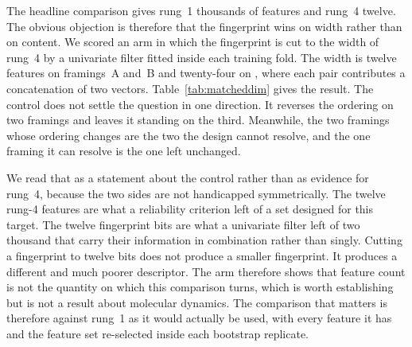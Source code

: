 The headline comparison gives rung~1 thousands of features and rung~4 twelve. The
obvious objection is therefore that the fingerprint wins on width rather than on
content. We scored an arm in which the fingerprint is cut to the width of rung~4 by a
univariate filter fitted inside each training fold. The width is twelve features on
framings~A and~B and twenty-four on \framingC{}, where each pair contributes a
concatenation of two vectors. Table~\ref{tab:matcheddim} gives the result. The control
does not settle the question in one direction. It reverses the ordering on two framings
and leaves it standing on the third. Meanwhile, the two framings whose ordering changes
are the two the design cannot resolve, and the one framing it can resolve is the one
left unchanged.

\begin{table}[tb]
  \centering
  \caption{\textbf{The matched-dimensionality control.} Rung~1 at its full width and
    cut to the width of rung~4 by a univariate filter fitted inside each training fold,
    against the best rung~4 reaches on the same framing. The last column marks the one
    framing on which this design can resolve a difference of the size it measures.}
  \label{tab:matcheddim}
  
\end{table}

We read that as a statement about the control rather than as evidence for rung~4,
because the two sides are not handicapped symmetrically. The twelve rung-4 features are
what a reliability criterion left of a set designed for this target. The twelve
fingerprint bits are what a univariate filter left of two thousand that carry their
information in combination rather than singly. Cutting a fingerprint to twelve bits
does not produce a smaller fingerprint. It produces a different and much poorer
descriptor. The arm therefore shows that feature count is not the quantity on which
this comparison turns, which is worth establishing but is not a result about molecular
dynamics. The comparison that matters is therefore against rung~1 as it would actually
be used, with every feature it has and the feature set re-selected inside each
bootstrap replicate.

